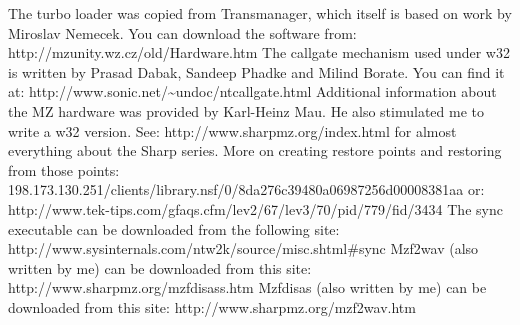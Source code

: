 \begin{thebibliography}{XX}
 The turbo loader was copied from Transmanager, which itself is 
             based on work by Miroslav Nemecek. You can download the software 
             from: http://mzunity.wz.cz/old/Hardware.htm 
 The callgate mechanism used under w32 is written by Prasad Dabak, 
             Sandeep Phadke and Milind Borate. You can find it at: 
             http://www.sonic.net/\~{}undoc/ntcallgate.html 
 Additional information about the MZ hardware was provided by 
             Karl-Heinz Mau.  He also stimulated me to write a w32 version. 
             See: http://www.sharpmz.org/index.html for almost everything 
             about the Sharp series.
 More on creating restore points and restoring from those points:
         198.173.130.251/clients/library.nsf/0/8da276c39480a06987256d00008381aa
         or: http://www.tek-tips.com/gfaqs.cfm/lev2/67/lev3/70/pid/779/fid/3434
 The sync executable can be downloaded from the following site:
              http://www.sysinternals.com/ntw2k/source/misc.shtml\#sync
 Mzf2wav (also written by me) can be downloaded from this site:
              http://www.sharpmz.org/mzfdisass.htm
 Mzfdisas (also written by me) can be downloaded from this site:
              http://www.sharpmz.org/mzf2wav.htm
\end{thebibliography}


